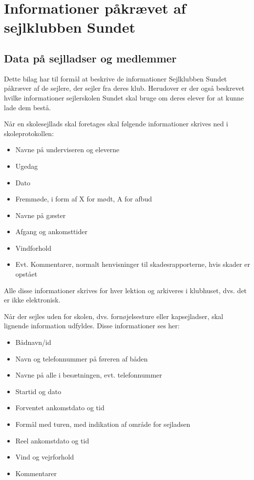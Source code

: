 \chapter{Informationer påkrævet af sejlklubben Sundet}\label{bilag:sundet}

\section{Data på sejlladser og medlemmer}

Dette bilag har til formål at beskrive de informationer Sejlklubben Sundet påkræver af de sejlere, der sejler fra deres klub. 
Herudover er der også beskrevet hvilke informationer sejlerskolen Sundet skal bruge om deres elever for at kunne lade dem bestå.

Når en skolesejllads skal foretages skal følgende informationer skrives ned i skoleprotokollen:

\begin{itemize}
	\item Navne på underviseren og eleverne
	\item Ugedag
	\item Dato
	\item Fremmøde, i form af X for mødt, A for afbud
	\item Navne på gæster
	\item Afgang og ankomsttider
	\item Vindforhold
	\item Evt. Kommentarer, normalt henvisninger til skadesrapporterne, hvis skader er opstået
\end{itemize}

Alle disse informationer skrives for hver lektion og arkiveres i klubhuset, dvs. det er ikke elektronisk.

Når der sejles uden for skolen, dvs. fornøjelsesture eller kapsejladser, skal lignende information udfyldes. 
Disse informationer ses her:

\begin{itemize}
	\item Bådnavn/id
	\item Navn og telefonnummer på føreren af båden
	\item Navne på alle i besætningen, evt. telefonnummer
	\item Startid og dato
	\item Forventet ankomstdato og tid
	\item Formål med turen, med indikation af område for sejladsen
	\item Reel ankomstdato og tid
	\item Vind og vejrforhold
	\item Kommentarer
\end{itemize}

